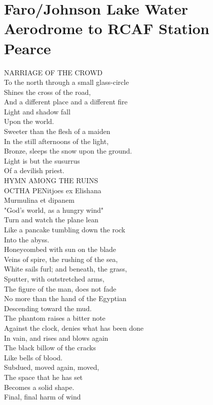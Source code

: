\documentclass[smalldemyvopaper,11pt,twoside,onecolumn,openright,extrafontsizes]{memoir}
\begin{document}
\chapter{Faro/Johnson Lake Water Aerodrome to RCAF Station Pearce}
NARRIAGE OF THE CROWD
\\To the north through a small glass-circle
\\Shines the cross of the road,
\\And a different place and a different fire
\\Light and shadow fall
\\Upon the world.
\\Sweeter than the flesh of a maiden
\\In the still afternoons of the light,
\\Bronze, sleeps the snow upon the ground.
\\Light is but the susurrus
\\Of a devilish priest.
\\HYMN AMONG THE RUINS
\\OCTHA PENitjoes ex Elishana
\\Murmulina et dipanem
\\"God's world, as a hungry wind"
\\Turn and watch the plane lean
\\Like a pancake tumbling down the rock
\\Into the abyss.
\\Honeycombed with sun on the blade
\\Veins of spire, the rushing of the sea,
\\White sails furl; and beneath, the grass,
\\Sputter, with outstretched arms,
\\The figure of the man, does not fade
\\No more than the hand of the Egyptian
\\Descending toward the mud.
\\The phantom raises a bitter note
\\Against the clock, denies what has been done
\\In vain, and rises and blows again
\\The black billow of the cracks
\\Like bells of blood.
\\Subdued, moved again, moved,
\\The space that he has set
\\Becomes a solid shape.
\\Final, final harm of wind
\end{document}
